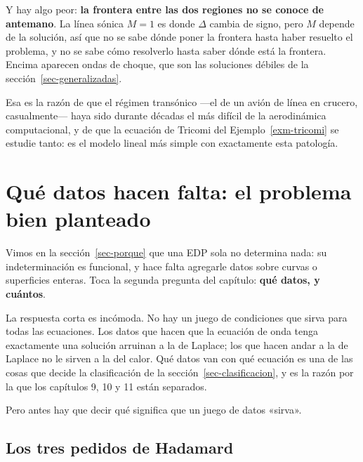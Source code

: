 \documentclass[
  spanish,
  a4paper,
]{scrbook}
\theoremstyle{definition}
\theoremstyle{plain}
\theoremstyle{definition}
\theoremstyle{plain}
\theoremstyle{definition}
\theoremstyle{remark}
\begin{document}
\begin{tcolorbox}
Y hay algo peor: \textbf{la frontera entre las dos regiones no se conoce
de antemano}. La línea sónica \(M=1\) es donde \(\Delta\) cambia de
signo, pero \(M\) depende de la solución, así que no se sabe dónde poner
la frontera hasta haber resuelto el problema, y no se sabe cómo
resolverlo hasta saber dónde está la frontera. Encima aparecen ondas de
choque, que son las soluciones débiles de la
sección~\ref{sec-generalizadas}.

Esa es la razón de que el régimen transónico ---el de un avión de línea
en crucero, casualmente--- haya sido durante décadas el más difícil de
la aerodinámica computacional, y de que la ecuación de Tricomi del
Ejemplo~\ref{exm-tricomi} se estudie tanto: es el modelo lineal más
simple con exactamente esta patología.

\end{tcolorbox}

\section{Qué datos hacen falta: el problema bien
planteado}\label{sec-bien-planteado}

Vimos en la sección~\ref{sec-porque} que una EDP sola no determina nada:
su indeterminación es funcional, y hace falta agregarle datos sobre
curvas o superficies enteras. Toca la segunda pregunta del capítulo:
\textbf{qué datos, y cuántos}.

La respuesta corta es incómoda. No hay un juego de condiciones que sirva
para todas las ecuaciones. Los datos que hacen que la ecuación de onda
tenga exactamente una solución arruinan a la de Laplace; los que hacen
andar a la de Laplace no le sirven a la del calor. Qué datos van con qué
ecuación es una de las cosas que decide la clasificación de la
sección~\ref{sec-clasificacion}, y es la razón por la que los capítulos
9, 10 y 11 están separados.

Pero antes hay que decir qué significa que un juego de datos «sirva».

\subsection{Los tres pedidos de Hadamard}\label{sec-hadamard-def}
\end{document}
